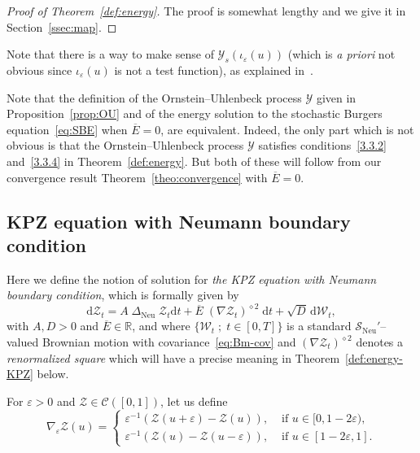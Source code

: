 \documentclass[AHL,Unicode,longabstracts]{cedram}
\DeclareMathOperator{\Neu}{Neu}
\newcommand{\bb}[1]{{\mathbb #1}}
\newcommand{\mc}[1]{{\mathcal #1}}
\renewcommand{\mc}[1]{{\mathcal #1}}
\newcommand{\SN}{\ensuremath{\mc S_{\Neu}}}
\renewcommand{\bar}{\overline}
\newcommand*{\dd}{\mathrm{d}}
\newcommand*{\dt}{\dd t}
\begin{document}
\begin{proof}[Proof of Theorem~\ref{def:energy}] The proof is somewhat lengthy and we give it in Section~\ref{ssec:map}.
\end{proof}

\begin{rema}
Note that there is a way to make sense of $\mc Y_s(\iota_\varepsilon(u))$ (which is \emph{a priori} not obvious since $\iota_\varepsilon(u)$ is not a test function), as explained in~\cite[Remark~4]{gj2014}.
\end{rema}

\begin{rema}
Note that the definition of the Ornstein--Uhlenbeck process $\mc Y$ given in Proposition~\ref{prop:OU} and of the energy solution to the stochastic Burgers equation~\eqref{eq:SBE} when $\bar E=0$, are equivalent. Indeed, the only part which is not obvious is that the Ornstein--Uhlenbeck process $\mc Y$ satisfies conditions~\eqref{3.3.2} and~\eqref{3.3.4} in Theorem~\ref{def:energy}. But both of these will follow from our convergence result Theorem~\ref{theo:convergence} with $\bar E=0$.
\end{rema}

\subsection{KPZ equation with Neumann boundary condition}\label{ssec:kpz}
Here we define the notion of solution for \emph{the KPZ equation with Neumann boundary condition}, which is formally given by
\begin{equation}\label{eq:KPZ}
\dd\mc Z_t = A \;\Delta_{\Neu}\; \mc Z_t \dt + \bar{E}\; (\nabla \mc Z_t)^{\diamond 2} \;\dt + \sqrt{D} \,\dd\mc W_t,
\end{equation}
with $A,D > 0$ and $\bar{E} \in \bb R$, and where $\{\mc W_t\; ; \; t\in[0,T]\}$ is a standard $\SN'$--valued Brownian motion with covariance~\eqref{eq:Bm-cov} and $(\nabla \mc Z_t)^{\diamond 2}$ denotes a \emph{renormalized square} which will have a precise meaning in Theorem~\ref{def:energy-KPZ} below.
\begin{defi}

For $\varepsilon>0$ and $\mc Z\in\mc C([0,1])$, let us define
\begin{equation}\label{eq:nablah}
\nabla_{\varepsilon} \mc Z (u) =
\begin{cases}
\varepsilon^{-1} (\mc Z (u + \varepsilon) - \mc Z (u)), & \text{ if } u \in [0, 1 - 2
\varepsilon),\\
\varepsilon^{-1} (\mc Z(u) - \mc Z(u - \varepsilon)), & \text{ if } u \in [1 - 2
\varepsilon, 1].
\end{cases}
\end{equation}
\end{defi}
\end{document}
